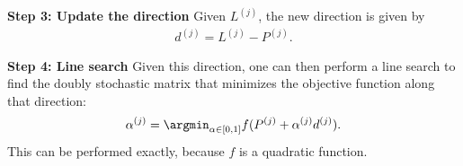 \documentclass[10pt,journal,cspaper,compsoc]{IEEEtran}
\newcommand{\PmcP}{P \in \mc{P}}
\begin{document}

\textbf{Step 3: Update the direction} Given $L^{(j)}$, the new direction is given by
\begin{align}
	d^{(j)}=L^{(j)}-P^{(j)}.
\end{align}


\textbf{Step 4: Line search} Given this direction, one can then perform a line search to find the doubly stochastic matrix that minimizes the objective function along that direction:
\begin{align}\label{eq:step}
	\alpha^{(j)} = \argmin_{\alpha \in [0,1]} f(P^{(j)} + \alpha^{(j)} d^{(j)}).
\end{align}
This can be performed exactly, because $f$ is a quadratic function.  
\end{document}
